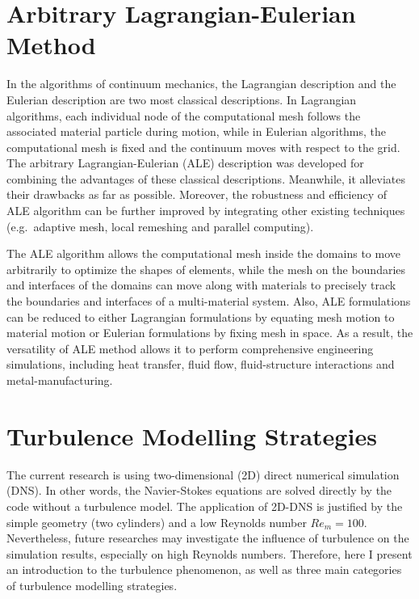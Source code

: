\section{Arbitrary Lagrangian-Eulerian Method} \label{sec ALE}

In the algorithms of continuum mechanics, the Lagrangian description and the Eulerian description are two most classical descriptions. In Lagrangian algorithms, each individual node of the computational mesh follows the associated material particle during motion, while in Eulerian algorithms, the computational mesh is fixed and the continuum moves with respect to the grid. The arbitrary Lagrangian-Eulerian (ALE) description was developed for combining the advantages of these classical descriptions. Meanwhile, it alleviates their drawbacks as far as possible. Moreover, the robustness and efficiency of ALE algorithm can be further improved by integrating other existing techniques (e.g.\ adaptive mesh, local remeshing and parallel computing). \cite{donea1982arbitrary,alemethod}

The ALE algorithm allows the computational mesh inside the domains to move arbitrarily to optimize the shapes of elements, while the mesh on the boundaries and interfaces of the domains can move along with materials to precisely track the boundaries and interfaces of a multi-material system. Also, ALE formulations can be reduced to either Lagrangian formulations by equating mesh motion to material motion or Eulerian formulations by fixing mesh in space. As a result, the versatility of ALE method allows it to perform comprehensive engineering simulations, including heat transfer, fluid flow, fluid-structure interactions and metal-manufacturing. 


\section{Turbulence Modelling Strategies} \label{sec turbulence m s}

The current research is using two-dimensional (2D) direct numerical simulation (DNS). In other words, the Navier-Stokes equations are solved directly by the code without a turbulence model. The application of 2D-DNS is justified by the simple geometry (two cylinders) and a low Reynolds number $ Re_m  =100 $. Nevertheless, future researches may investigate the influence of turbulence on the simulation results, especially on high Reynolds numbers. 
Therefore, here I present an introduction to the turbulence phenomenon, as well as three main categories of turbulence modelling strategies.



